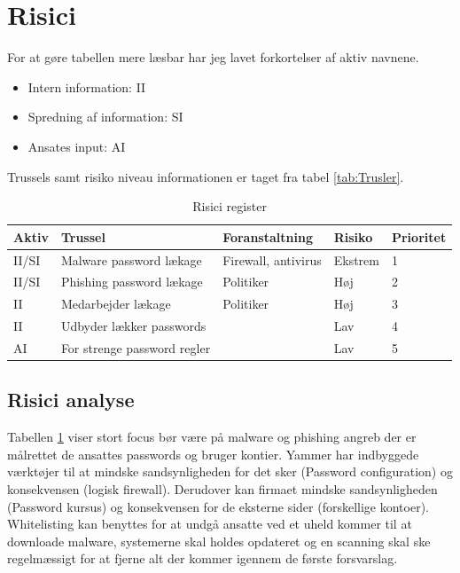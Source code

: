 \documentclass{article}
\begin{document}
\section{Risici}
For at gøre tabellen mere læsbar har jeg lavet forkortelser af aktiv navnene. 
\begin{itemize}
    \item{Intern information:} II
    \item{Spredning af information:} SI
    \item{Ansates input:} AI
\end{itemize}
Trussels samt risiko niveau informationen er taget fra tabel \ref{tab:Trusler}. 

\begin{table}[h!]
    \begin{center}
        \begin{tabularx}{\textwidth}{l|X|X|l|l}
            Aktiv    & Trussel                              & Foranstaltning      & Risiko & Prioritet \\  \hline 
            II/SI    & Malware password lækage              & Firewall, antivirus & Ekstrem& 1\\
            II/SI    & Phishing password lækage             & Politiker           & Høj    & 2\\ 
            II       & Medarbejder lækage                   & Politiker           & Høj    & 3\\
            II       & Udbyder lækker passwords             &                     & Lav    & 4\\
            AI       & For strenge password regler          &                     & Lav    & 5\\
        \end{tabularx}
    \end{center}
    \caption{Risici register}
    \label{tab:riskReg}
\end{table}
 
\subsection{Risici analyse}

Tabellen \ref{tab:riskReg} viser stort focus bør være på malware og phishing angreb
der er målrettet de ansattes passwords og bruger kontier. Yammer har indbyggede 
værktøjer til at mindske sandsynligheden for det sker (Password configuration) og
konsekvensen (logisk firewall). Derudover kan firmaet mindske sandsynligheden (Password kursus)
og konsekvensen for de eksterne sider (forskellige kontoer). Whitelisting kan benyttes for
at undgå ansatte ved et uheld kommer til at downloade malware, systemerne skal holdes opdateret
og en scanning skal ske regelmæssigt for at fjerne alt der kommer igennem de første forsvarslag.
\end{document}

